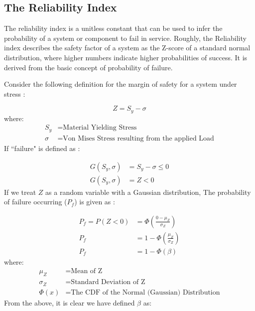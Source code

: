 \subsection{The Reliability Index}
\label{sec:beta}
The reliability index is a unitless constant that can be used to infer the probability of a system or component to fail in service. Roughly, the Reliability index describes the safety factor of a system as the Z-score of a standard normal distribution, where higher numbers indicate higher probabilities of success. It is derived from the basic concept of probability of failure. 

Consider the following definition for the margin of safety for a system under stress \cite{struct-rel}:

\begin{equation}
Z = S_y - \sigma
\end{equation}
where:
\begin{align*}
S_y &= \text{Material Yielding Stress}\\
\sigma &= \text{Von Mises Stress resulting from the applied Load}
\end{align*}
If ``failure" is defined as \cite{struct-rel}:

\begin{align}
G\left( S_y, \sigma\right) &= S_y - \sigma \le 0\nonumber\\
G\left( S_y, \sigma\right) &= Z < 0
\end{align}
If we treat $Z$ as a random variable with a Gaussian distribution, The probability of failure occurring ($P_f$) is given as \cite{struct-rel}:

\begin{align}
P_f = P(Z<0) &= \Phi \left( \frac{0 - \mu_Z}{\sigma_Z}  \right)\nonumber\\
P_f &= 1 - \Phi \left( \frac{\mu_Z}{\sigma_Z} \right)\nonumber\\
P_f &= 1 - \Phi \left( \beta \right)\label{eq:Pf}
\end{align}
where:
\begin{align*}
\mu_Z &= \text{Mean of Z}\\
\sigma_Z &= \text{Standard Deviation of Z}\\
\Phi(x) &= \text{The CDF of the Normal (Gaussian) Distribution}
\end{align*}
From the above, it is clear we have defined $\beta$ as:


